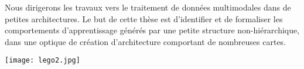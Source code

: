\documentclass[../main]{subfiles}
\begin{document}
Nous dirigerons les travaux vers le traitement de données multimodales dans de petites architectures. Le but de cette thèse est d'identifier et de formaliser les comportements d'apprentissage générés par une petite structure non-hiérarchique, dans une optique de création d'architecture comportant de nombreuses cartes.

\begin{figure*}[b]
    \centering\texttt{[image: lego2.jpg]}
\end{figure*}

\ifSubfilesClassLoaded{
    \printbibliography
}{}
\end{document}
